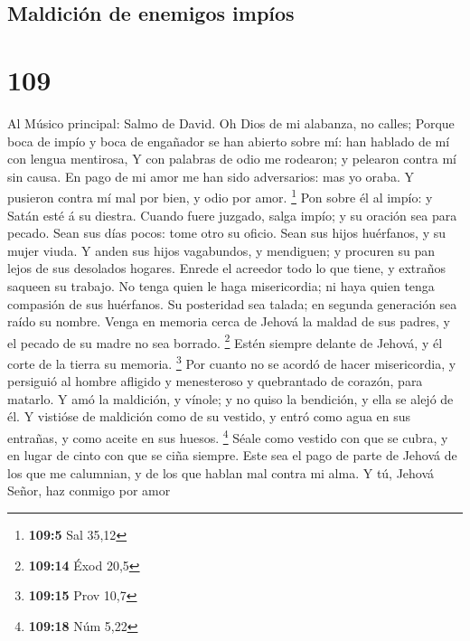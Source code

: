 \hypertarget{maldiciuxf3n-de-enemigos-impuxedos}{%
\subsection{Maldición de enemigos
impíos}\label{maldiciuxf3n-de-enemigos-impuxedos}}

\hypertarget{section-108}{%
\section{109}\label{section-108}}

 Al Músico principal: Salmo de David. Oh Dios de mi
alabanza, no calles;  Porque boca de impío y boca de
engañador se han abierto sobre mí: han hablado de mí con lengua
mentirosa,  Y con palabras de odio me rodearon; y pelearon
contra mí sin causa.  En pago de mi amor me han sido
adversarios: mas yo oraba.  Y pusieron contra mí mal por
bien, y odio por amor. \footnote{\textbf{109:5} Sal 35,12} 
Pon sobre él al impío: y Satán esté á su diestra.  Cuando
fuere juzgado, salga impío; y su oración sea para pecado. 
Sean sus días pocos: tome otro su oficio.  Sean sus hijos
huérfanos, y su mujer viuda.  Y anden sus hijos vagabundos,
y mendiguen; y procuren su pan lejos de sus desolados hogares.
 Enrede el acreedor todo lo que tiene, y extraños saqueen
su trabajo.  No tenga quien le haga misericordia; ni haya
quien tenga compasión de sus huérfanos.  Su posteridad sea
talada; en segunda generación sea raído su nombre.  Venga
en memoria cerca de Jehová la maldad de sus padres, y el pecado de su
madre no sea borrado. \footnote{\textbf{109:14} Éxod 20,5} 
Estén siempre delante de Jehová, y él corte de la tierra su memoria.
\footnote{\textbf{109:15} Prov 10,7}  Por cuanto no se
acordó de hacer misericordia, y persiguió al hombre afligido y
menesteroso y quebrantado de corazón, para matarlo.  Y amó
la maldición, y vínole; y no quiso la bendición, y ella se alejó de él.
 Y vistióse de maldición como de su vestido, y entró como
agua en sus entrañas, y como aceite en sus huesos. \footnote{\textbf{109:18}
  Núm 5,22}  Séale como vestido con que se cubra, y en
lugar de cinto con que se ciña siempre.  Este sea el pago
de parte de Jehová de los que me calumnian, y de los que hablan mal
contra mi alma.  Y tú, Jehová Señor, haz conmigo por amor
